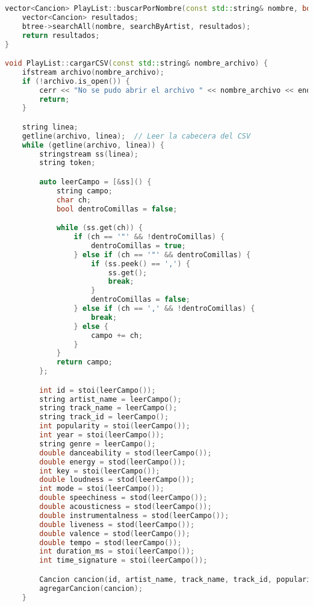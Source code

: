 \documentclass[12pt]{article}
\begin{document}
\begin{flushleft}
\begin{lstlisting}[language=C++, style=mystyle, caption={Código de la Clase Playlist}]
vector<Cancion> PlayList::buscarPorNombre(const std::string& nombre, bool searchByArtist) {
    vector<Cancion> resultados;
    btree->searchAll(nombre, searchByArtist, resultados);
    return resultados;
}

void PlayList::cargarCSV(const std::string& nombre_archivo) {
    ifstream archivo(nombre_archivo);
    if (!archivo.is_open()) {
        cerr << "No se pudo abrir el archivo " << nombre_archivo << endl;
        return;
    }

    string linea;
    getline(archivo, linea);  // Leer la cabecera del CSV
    while (getline(archivo, linea)) {
        stringstream ss(linea);
        string token;

        auto leerCampo = [&ss]() {
            string campo;
            char ch;
            bool dentroComillas = false;

            while (ss.get(ch)) {
                if (ch == '"' && !dentroComillas) {
                    dentroComillas = true;
                } else if (ch == '"' && dentroComillas) {
                    if (ss.peek() == ',') {
                        ss.get();
                        break;
                    }
                    dentroComillas = false;
                } else if (ch == ',' && !dentroComillas) {
                    break;
                } else {
                    campo += ch;
                }
            }
            return campo;
        };

        int id = stoi(leerCampo());
        string artist_name = leerCampo();
        string track_name = leerCampo();
        string track_id = leerCampo();
        int popularity = stoi(leerCampo());
        int year = stoi(leerCampo());
        string genre = leerCampo();
        double danceability = stod(leerCampo());
        double energy = stod(leerCampo());
        int key = stoi(leerCampo());
        double loudness = stod(leerCampo());
        int mode = stoi(leerCampo());
        double speechiness = stod(leerCampo());
        double acousticness = stod(leerCampo());
        double instrumentalness = stod(leerCampo());
        double liveness = stod(leerCampo());
        double valence = stod(leerCampo());
        double tempo = stod(leerCampo());
        int duration_ms = stoi(leerCampo());
        int time_signature = stoi(leerCampo());

        Cancion cancion(id, artist_name, track_name, track_id, popularity, year, genre, danceability, energy, key, loudness, mode, speechiness, acousticness, instrumentalness, liveness, valence, tempo, duration_ms, time_signature);
        agregarCancion(cancion);
    }


\end{lstlisting}
\end{flushleft}
\end{document}
